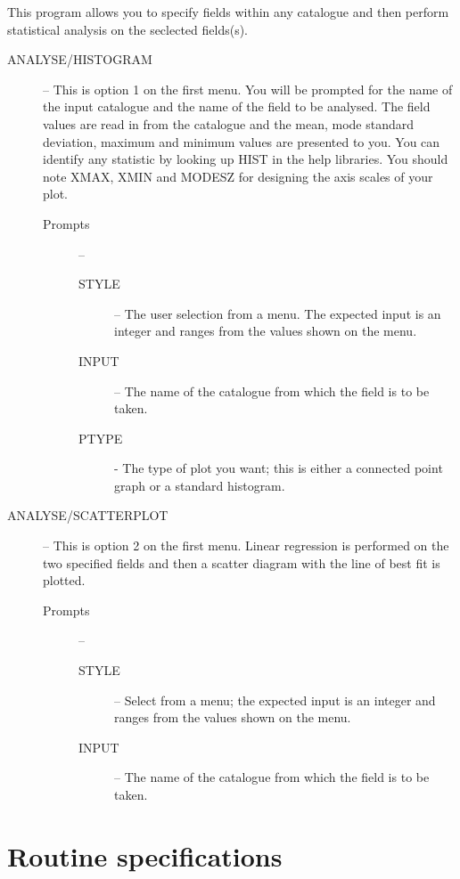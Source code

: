\documentclass[twoside,11pt]{article}
\newcommand{\xlabel}[1]{}
\renewcommand{\_}{\texttt{\symbol{95}}}
\begin{document}
This program allows you to specify fields within any catalogue and then perform
statistical analysis on the seclected fields(s).
\begin{description}
  \item [ANALYSE/HISTOGRAM] --
  This is option 1 on the first menu.
  You will be prompted for the name of the input catalogue and the name of the
  field to be analysed.
  The field values are read in from the catalogue and the mean, mode standard
  deviation, maximum and minimum values are presented to you.
  You can identify any statistic by looking up HIST in the help libraries.
  You should note X\_MAX, X\_MIN and MODE\_SZ for designing the axis scales of
  your plot.
  \begin{description}
    \item [Prompts] --
    \begin{description}
      \item [STYLE] -- The user selection from a menu.
      The expected input is an integer and ranges from the values shown on the menu.
      \item [INPUT] -- The name of the catalogue from which the field is to be taken.
      \item [PTYPE] - The type of plot you want; this is either a connected point graph or
      a standard histogram.
    \end{description}
  \end{description}
  \item [ANALYSE/SCATTERPLOT] --
  This is option 2 on the first menu.
  Linear regression is performed on the two specified fields and then a scatter
  diagram with the line of best fit is plotted.
  \begin{description}
    \item [Prompts] --
    \begin{description}
      \item [STYLE]-- Select from a menu; the expected input is an integer
      and ranges from the values shown on the menu.
      \item [INPUT] -- The name of the catalogue from which the field is to be taken.
    \end{description}
  \end{description}
\end{description}
\newpage

\section{Routine specifications\xlabel{routine_specifications}}
\end{document}
